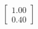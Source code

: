 \documentclass[preview]{standalone}
\begin{document}
\begin{align*}
\begin{bmatrix} 1.00 \\ 0.40 \end{bmatrix}
\end{align*}
\end{document}
